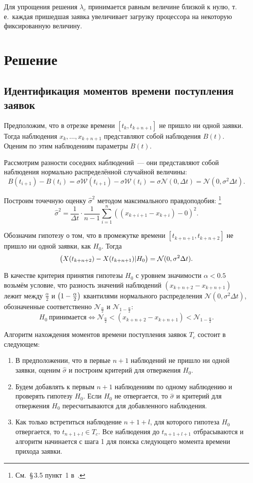 \documentclass[a4paper,10pt]{article}
\begin{document}
Для упрощения решения $\lambda_c$ принимается равным величине близкой к нулю,
т.\,е.~каждая пришедшая заявка увеличивает загрузку процессора на некоторую 
фиксированную величину.

\section{Решение}
\subsection{Идентификация моментов времени поступления заявок}%
\label{find-requests}
Предположим, что в отрезке времени $[t_k, t_{k+n+1}]$ 
не пришло ни одной заявки.
Тогда наблюдения $x_k,\ldots,x_{k+n+1}$ представляют собой наблюдения
$B(t)$.
Оценим по этим наблюдениям параметры $B(t)$.

Рассмотрим разности соседних наблюдений~--- они представляют собой наблюдения 
нормально распределённой случайной величины:
$$B(t_{i+1}) - B(t_i) = 
    \sigma \mathcal{W}(t_{i+1}) - \sigma \mathcal{W}(t_i) = 
    \sigma \mathcal{N}(0, \Delta t) = 
    \mathcal{N}(0, \sigma^2 \Delta t).$$

Построим точечную оценку $\widehat{\sigma}^2$ 
методом максимального правдоподобия:%
\footnote{См.~\S\,3.5 пункт~1 в~\cite{ivchmed2010matstat}.}
%
$$\widehat{\sigma}^2 = 
    \frac{1}{\Delta t}\cdot\frac{1}{n-1}
        \sum\limits_{i=1}^n ((x_{k+i+1} - x_{k+i}) - 0)^2.$$

Обозначим гипотезу о том, что в промежутке времени 
$[t_{k+n+1}, t_{k+n+2}]$ не пришло ни одной заявки, 
как $H_0$.
Тогда 
$$\del{X(t_{k+n+2})-X(t_{k+n+1}) \vert H_0} = 
    \mathcal{N}(0, \sigma^2 \Delta t).$$

В качестве критерия принятия гипотезы $H_0$ с уровнем значимости 
$\alpha < 0.5$ 
возьмём условие, что разность значений наблюдений $(x_{k+n+2}-x_{k+n+1})$
лежит между $\frac{\alpha}{2}$ и $\del{1 - \frac{\alpha}{2}}$ квантилями
нормального распределения $\mathcal{N}(0, \sigma^2 \Delta t)$,
обозначенные соответственно $\mathcal{N}_{\frac{\alpha}{2}}$ и 
$\mathcal{N}_{1 - \frac{\alpha}{2}}$:
$$
H_0 \  \mathrm{\text{принимается}} \iff
    \mathcal{N}_{\frac{\alpha}{2}} < 
        (x_{k+n+2}-x_{k+n+1}) < 
	    \mathcal{N}_{1 - \frac{\alpha}{2}}.
$$

Алгоритм нахождения моментов времени поступления заявок $T_c$ 
состоит в следующем:
\begin{enumerate}
  \item В предположении, что в первые $n+1$ наблюдений не пришло ни одной 
  заявки, оценим $\widehat{\sigma}$ и построим критерий для отвержения $H_0$.
  \item Будем добавлять к первым $n+1$ наблюдениям по одному наблюдению и 
  проверять гипотезу $H_0$.
  Если $H_0$ не отвергается, то $\widehat{\sigma}$ и критерий для отвержения $H_0$ 
  пересчитываются для добавленного наблюдения.
  \item Как только встретиться наблюдение $n+1+l$, для которого гипотеза $H_0$
  отвергается, то \mbox{$t_{n+1+l} \in T_c$}. 
  Все наблюдения до $t_{n+1+l+1}$ отбрасываются и алгоритм начинается с шага 1
  для поиска следующего момента времени прихода заявки.
\end{enumerate}
\end{document}
